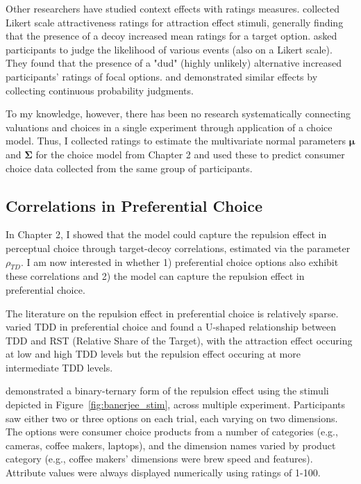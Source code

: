 Other researchers have studied context effects with ratings measures. \textcite{wedellUsingJudgmentsUnderstand} collected Likert scale attractiveness ratings for attraction effect stimuli, generally finding that the presence of a decoy increased mean ratings for a target option. \textcite{windschitl2004dud} asked participants to judge the likelihood of various events (also on a Likert scale). They found that the presence of a "dud" (highly unlikely) alternative increased participants' ratings of focal options. \textcite{caiWhenAlternativeHypotheses2023} and \textcite{fang2024context} demonstrated similar effects by collecting continuous probability judgments.

To my knowledge, however, there has been no research systematically connecting valuations and choices in a single experiment through application of a choice model. Thus, I collected ratings to estimate the multivariate normal parameters $\boldsymbol{\mu}$ and $\boldsymbol{\Sigma}$ for the choice model from Chapter 2 and used these to predict consumer choice data collected from the same group of participants.

\subsection{Correlations in Preferential Choice}
In Chapter 2, I showed that the model could capture the repulsion effect in perceptual choice \parencite{spektorWhenGoodLooks2018b} through target-decoy correlations, estimated via the parameter $\rho_{TD}$. I am now interested in whether 1) preferential choice options also exhibit these correlations and 2) the model can capture the repulsion effect in preferential choice. 

The literature on the repulsion effect in preferential choice is relatively sparse. \textcite{liaoInfluenceDistanceDecoy2021} varied TDD in preferential choice and found a U-shaped relationship between TDD and RST (Relative Share of the Target), with the attraction effect occuring at low and high TDD levels but the repulsion effect occuring at more intermediate TDD levels. 

\textcite{banerjeeFactorsThatPromote2024} demonstrated a binary-ternary form of the repulsion effect using the stimuli depicted in Figure~\ref{fig:banerjee_stim}, across multiple experiment. Participants saw either two or three options on each trial, each varying on two dimensions. The options were consumer choice products from a number of categories (e.g., cameras, coffee makers, laptops), and the dimension names varied by product category (e.g., coffee makers' dimensions were brew speed and features). Attribute values were always displayed numerically using ratings of 1-100.

